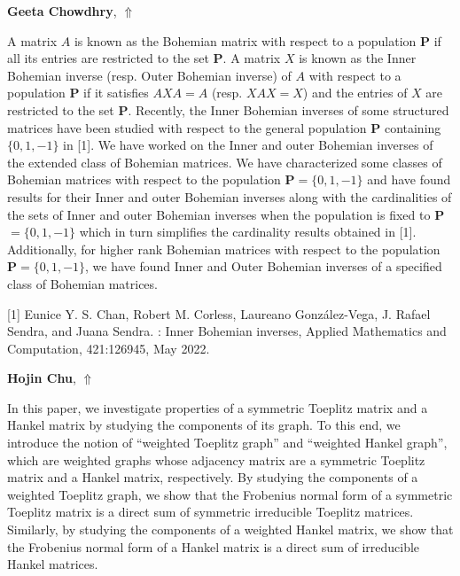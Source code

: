 \documentclass[ILAS2025-program.tex]{subfiles}
\begin{document}
\hypertarget{down0405}{}\begin{ilasabstract}
    
\textbf{Geeta Chowdhry},  \hfill \hyperlink{up0405}{$\Uparrow$}
    
    
\mtskip
    A matrix $A$ is known as the Bohemian matrix with respect to a population \textbf{P} if all its entries are restricted to the set \textbf{P}. A matrix $X$ is known as the Inner Bohemian inverse (resp. Outer Bohemian inverse) of $A$ with respect to a population \textbf{P} if it satisfies $AXA=A$ (resp. $XAX=X$) and the entries of $X$ are restricted to the set \textbf{P}.
Recently, the Inner Bohemian inverses of some structured matrices have been studied with respect to the general population \textbf{P} containing $\{0,1,-1\}$ in [1]. We have worked on the Inner and outer Bohemian inverses of the extended class of Bohemian matrices. We have characterized some classes of Bohemian matrices with respect to the population \textbf{P}$=\{0,1,-1\}$ and have found results for their Inner and outer Bohemian inverses along with the cardinalities of the sets of Inner and outer Bohemian inverses when the population is fixed to \textbf{P}$=\{0,1,-1\}$ which in turn simplifies the cardinality results obtained in [1]. Additionally, for higher rank Bohemian matrices with respect to the population \textbf{P}$=\{0,1,-1\}$, we have found Inner and Outer Bohemian inverses of a specified class of Bohemian matrices.

\mbox{[1]} Eunice Y. S. Chan, Robert M. Corless, Laureano González-Vega, J. Rafael Sendra, and Juana Sendra. : Inner Bohemian inverses, Applied Mathematics and Computation, 421:126945, May 2022.

\end{ilasabstract}
    

\hypertarget{down0407}{}\begin{ilasabstract}
    
\textbf{Hojin Chu},  \hfill \hyperlink{up0407}{$\Uparrow$}
    
    
\mtskip
    In this paper, we investigate properties of a symmetric Toeplitz matrix and a Hankel matrix by studying the components of its graph.
To this end, we introduce the notion of ``weighted Toeplitz graph'' and ``weighted Hankel graph'', which are weighted graphs whose adjacency matrix are a symmetric Toeplitz matrix and a Hankel matrix, respectively.
By studying the components of a weighted Toeplitz graph, we show that the Frobenius normal form of a symmetric Toeplitz matrix is a direct sum of symmetric irreducible Toeplitz matrices.
Similarly, by studying the components of a weighted Hankel matrix, we show that the Frobenius normal form of a Hankel matrix is a direct sum of irreducible Hankel matrices.
\end{ilasabstract}
    
\end{document}
